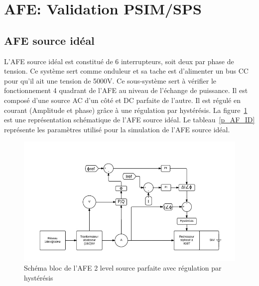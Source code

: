 \documentclass[11pt,letterpaper,final]{report}
\begin{document}
\clearpage
\section{AFE: Validation PSIM/SPS}
\subsection{AFE source idéal}
L'AFE source idéal est constitué de 6 interrupteurs, soit deux par phase de tension. Ce système sert comme onduleur et sa tache est d'alimenter un bus CC pour qu'il ait une tension de 5000V. Ce sous-système sert à vérifier le fonctionnement 4 quadrant de l'AFE au niveau de l'échange de puissance. Il est composé d'une source AC d'un côté et DC parfaite de l'autre. Il est régulé en courant (Amplitude et phase) grâce à une régulation par hystérésis. La figure~\ref{AFE} est une représentation schématique de l'AFE source idéal. Le tableau~\ref{p_AF_ID} représente les paramètres utilisé pour la simulation de l'AFE source idéal.

\begin{figure}[htb]
\centering
\includegraphics[scale=0.5]{Fig/AFEIDEAL/AFE.jpg}
\caption{Schéma bloc de l'AFE 2 level source parfaite avec régulation par hystérésis}
\label{AFE}
\end{figure}
\end{document}
